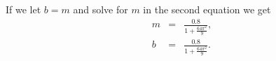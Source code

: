 \begin{frame}

  If we let $b=m$ and solve for $m$ in the second equation we get
  \begin{eqnarray*}
    m & = & \frac{0.8}{1 + \frac{64 \pi^2}{9}}, \\
    b & = & \frac{0.8}{1 + \frac{64 \pi^2}{9}}.
  \end{eqnarray*}

\end{frame}



